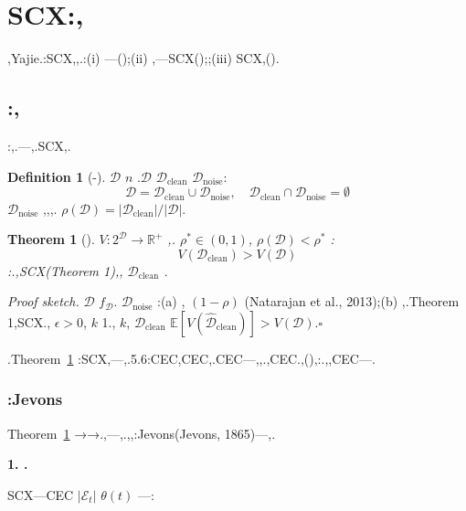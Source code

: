 \documentclass[12pt,a4paper]{article}
\newtheorem{theorem}{Theorem}[section]
\theoremstyle{definition}
\newtheorem{definition}{Definition}[section]
\theoremstyle{remark}
\begin{document}
\section{SCX:,}

,Yajie.:SCX,,.:(i) ---();(ii) ,---SCX();;(iii) SCX,().

\subsection{:,}

:,.---,.SCX,.

\begin{definition}[-]
 $\mathcal{D}$  $n$ .$\mathcal{D}$  $\mathcal{D}_{\text{clean}}$  $\mathcal{D}_{\text{noise}}$:
\begin{equation}
\mathcal{D} = \mathcal{D}_{\text{clean}} \cup \mathcal{D}_{\text{noise}}, \quad \mathcal{D}_{\text{clean}} \cap \mathcal{D}_{\text{noise}} = \emptyset
\end{equation}
 $\mathcal{D}_{\text{noise}}$ ,,,. $\rho(\mathcal{D}) = |\mathcal{D}_{\text{clean}}| / |\mathcal{D}|$.
\end{definition}

\begin{theorem}[]
\label{thm:storage-paradox}
 $V: 2^{\mathcal{D}} \to \mathbb{R}^+$ ,. $\rho^* \in (0, 1)$, $\rho(\mathcal{D}) < \rho^*$ :
\begin{equation}
V(\mathcal{D}_{\text{clean}}) > V(\mathcal{D})
\end{equation}
:.,SCX(Theorem 1),, $\mathcal{D}_{\text{clean}}$ .
\end{theorem}

\textit{Proof sketch.}  $\mathcal{D}$  $f_{\mathcal{D}}$. $\mathcal{D}_{\text{noise}}$ :(a) , $(1-\rho)$ (Natarajan et al., 2013);(b) ,.Theorem 1,SCX., $\epsilon > 0$, $k$ 1., $k$, $\hat{\mathcal{D}}_{\text{clean}}$  $\mathbb{E}[V(\hat{\mathcal{D}}_{\text{clean}})] > V(\mathcal{D})$.\hfill $\square$

.Theorem~\ref{thm:storage-paradox} :SCX,---,.5.6:CEC,CEC,.CEC---,,.,CEC.,(),:.,,CEC---.

\subsubsection{:Jevons}

Theorem~\ref{thm:storage-paradox} →→.,---,.,,:Jevons(Jevons, 1865)---,.

\medskip
\noindent\textbf{1. .}

SCX---CEC $|\mathcal{E}_t|$  $\theta(t)$ ---:
\end{document}

